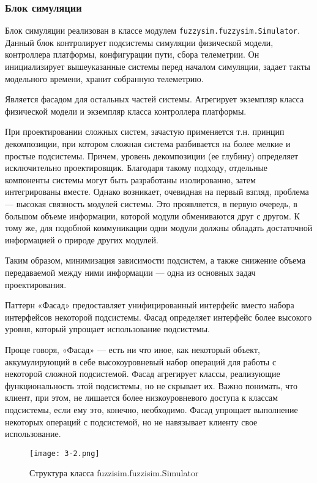 \subsubsection{Блок симуляции  }


Блок симуляции реализован в классе модулем \lstinline!fuzzysim.fuzzysim.Simulator!. Данный блок контролирует подсистемы симуляции физической модели, контроллера платформы, конфигурации пути, сбора телеметрии. Он инициализирует вышеуказанные системы перед началом симуляции, задает такты модельного времени, хранит собранную телеметрию.

Является фасадом для остальных частей системы. Агрегирует экземпляр класса физической модели и экземпляр класса контроллера платформы.

При проектировании сложных систем, зачастую применяется т.н. принцип декомпозиции, при котором сложная система разбивается на более мелкие и простые подсистемы. Причем, уровень декомпозиции (ее глубину) определяет исключительно проектировщик. Благодаря такому подходу, отдельные компоненты системы могут быть разработаны изолированно, затем интегрированы вместе. Однако возникает, очевидная на первый взгляд, проблема — высокая связность модулей системы. Это проявляется, в первую очередь, в большом объеме информации, которой модули обмениваются друг с другом. К тому же, для подобной коммуникации одни модули должны обладать достаточной информацией о природе других модулей.

Таким образом, минимизация зависимости подсистем, а также снижение объема передаваемой между ними информации — одна из основных задач проектирования.

Паттерн «Фасад» предоставляет унифицированный интерфейс вместо набора интерфейсов некоторой подсистемы. Фасад определяет интерфейс более высокого уровня, который упрощает использование подсистемы.

Проще говоря, «Фасад» — есть ни что иное, как некоторый объект, аккумулирующий в себе высокоуровневый набор операций для работы с некоторой сложной подсистемой. Фасад агрегирует классы, реализующие функциональность этой подсистемы, но не скрывает их. Важно понимать, что клиент, при этом, не лишается более низкоуровневого доступа к классам подсистемы, если ему это, конечно, необходимо. Фасад упрощает выполнение некоторых операций с подсистемой, но не навязывает клиенту свое использование.

\begin{figure}[ht]
  \centering
  \texttt{[image: 3-2.png]}
  \caption{ Структура класса fuzzisim.fuzzisim.Simulator}
\end{figure}


